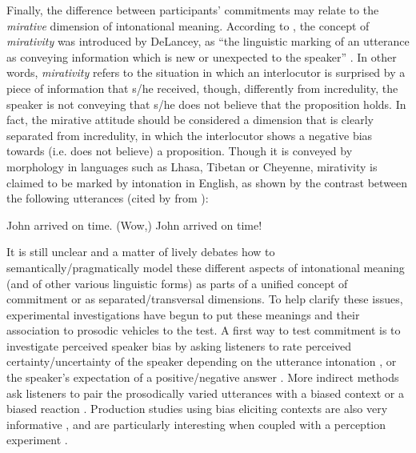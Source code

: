 \documentclass[output=paper,colorlinks,citecolor=brown]{langscibook}
\begin{document}
Finally, the difference between participants' commitments may relate to the \textit{mirative} dimension of intonational meaning. According to \citet{CeJugLanL18}, the concept of \textit{mirativity} was introduced by DeLancey, as ``the linguistic marking of an utterance as conveying information which is new or unexpected to the speaker'' \citep[369--370]{DELANCEY2001369}. In other words, \textit{mirativity} refers to the situation in which an interlocutor is surprised by a piece of information that s/he received, though, differently from incredulity, the speaker is not conveying that s/he does not believe that the proposition holds. In fact, the mirative attitude should be considered a dimension that is clearly separated from incredulity, in which the interlocutor shows a negative bias towards (i.e. does not believe) a proposition. Though it is conveyed by morphology in languages such as Lhasa, Tibetan or Cheyenne, mirativity is claimed to be marked by intonation in English, as shown by the contrast between the following utterances (cited by \citealt[219]{CeJugLanL18} from
\citealt[455]{Rett2013-RETASA}):

\ea\label{ex:1}
\ea
John arrived on time.
\ex
(Wow,) John arrived on time!
\z
\z

It is still unclear and a matter of lively debates how to semantically/prag\-ma\-ti\-cal\-ly model these different aspects of intonational meaning (and of other various linguistic forms) as parts of a unified concept of commitment or as separated/trans\-ver\-sal dimensions. To help clarify these issues, experimental investigations have begun to put these meanings and their association to prosodic vehicles to the test. A first way to test commitment is to investigate perceived speaker bias by asking listeners to rate perceived certainty/uncertainty of the speaker depending on the utterance intonation \citep{armstrong2015contribution, Gravano2008TheEO}, or the speaker's expectation of a positive/negative answer \citep{Lai2010, nilsenova_rises_2006}. More indirect methods ask listeners to pair the prosodically varied utterances with a biased context \citep{prieto2018question} or a biased reaction \citep{portesetal2014, Baltazanietal2020}. Production studies using bias eliciting contexts are also very informative \citep{MiPorCham-Lav2016}, and are particularly interesting when coupled with a perception experiment \citep{GoodhueWagner2018}.
\end{document}
